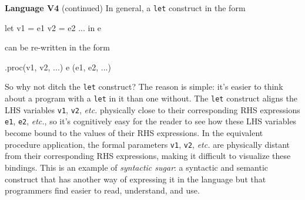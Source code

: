 \begin{minipage}[t]{\sw}
\slidenumber
\LARGE
{\bf Language V4} (continued)\exx
In general, a \verb'let' construct in the form
\Large
\begin{qv}
let
  v1 = e1
  v2 = e2
  ...
in
  e
\end{qv}
\LARGE
can be re-written in the form
\Large
\begin{qv}
.proc(v1, v2, ...) e (e1, e2, ...)
\end{qv}
\LARGE
So why not ditch the \verb'let' construct?
The reason is simple:
it's easier to think about a program with a \verb'let' in it
than one without.
The \verb'let' construct aligns
the LHS variables \verb'v1', \verb'v2', {\em etc.}
physically close to their corresponding RHS expressions
\verb'e1', \verb'e2', {\em etc.},
so it's cognitively easy for the reader
to see how these LHS variables become bound
to the values of their RHS expressions.
In the equivalent procedure application,
the formal parameters \verb'v1', \verb'v2', {\em etc.}
are physically distant from their corresponding RHS expressions,
making it difficult to visualize these bindings.\exx
This is an example of {\em syntactic sugar}:
a syntactic and semantic construct
that has another way of expressing it in the language
but that programmers find easier to read, understand, and use.
\end{minipage}

